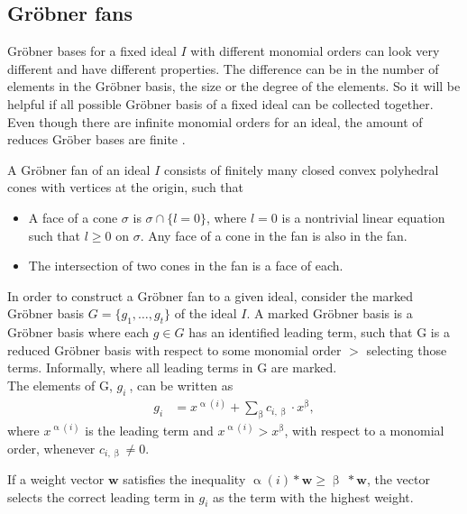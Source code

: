 \subsection{Gröbner fans}
\label{subsec:Groebnerfan}
 Gröbner bases for a fixed ideal $I$ with different monomial orders can look very different and have different properties. The difference can be in the number of elements in the Gröbner basis, the size or the degree of the elements. So it will be helpful if all 
possible Gröbner basis of a fixed ideal can be collected together.\\
Even though there are infinite monomial orders for an ideal, the amount of reduces Gröber bases are finite \cite{coxOshea}. 
 
\begin{env_definition}
\cite{coxOshea} A Gröbner fan of an ideal $I$ consists of finitely many closed convex polyhedral cones with vertices at the origin, such that

\begin{itemize}
\item
A face of a cone $\sigma$ is $\sigma \cap \lbrace l=0\rbrace$, where $l=0$ is a nontrivial linear equation such that $l \geq 0$ on $\sigma$.
Any face of a cone in the fan is also in the fan.
\item
The intersection of two cones in the fan is a face of each.
\end{itemize}

\end{env_definition}

In order to construct a Gröbner fan to a given ideal, consider the marked Gröbner basis $G = \lbrace g_{1},\dots,g_{t}\rbrace $ of the ideal $I$.
A marked Gröbner basis is a Gröbner basis where each $g \in G$ has an identified leading term, such that G is a reduced Gröbner basis with respect to some monomial order $>$ selecting those terms.
Informally, where all leading terms in G are marked.\\
\newline
The elements of G, $g_{i}~$, can be written as
\begin{align*}
 g_{i} &  = x^{\upalpha\left( i\right) } +  \sum_{\upbeta} c_{i,\upbeta} \cdot x^{\upbeta}, 
\end{align*}
where $ x^{\upalpha\left( i\right) }$ is the leading term and $ x^{\upalpha\left( i\right) } > x^{\upbeta} $, with respect to a monomial order, whenever $c_{i,\upbeta} \neq 0 $.

If a weight vector $\textbf{w}$ satisfies the inequality
$\upalpha\left( i\right) \ast \textbf{w} \geq \upbeta~\ast\textbf{w}$, the vector selects the correct leading term in $g_{i}$ as the term with the highest weight.\\

